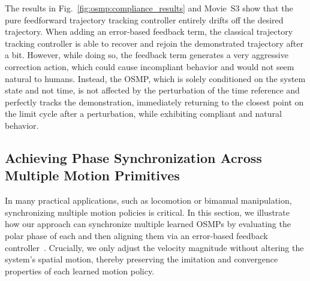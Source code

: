 The results in Fig.~\ref{fig:osmp:compliance_results} and Movie~S3 show that the pure feedforward trajectory tracking controller entirely drifts off the desired trajectory. When adding an error-based feedback term, the classical trajectory tracking controller is able to recover and rejoin the demonstrated trajectory after a bit. However, while doing so, the feedback term generates a very aggressive correction action, which could cause incompliant behavior and would not seem natural to humans. Instead, the \gls{OSMP}, which is solely conditioned on the system state and not time, is not affected by the perturbation of the time reference and perfectly tracks the demonstration, immediately returning to the closest point on the limit cycle after a perturbation, while exhibiting compliant and natural behavior.


\subsection{Achieving Phase Synchronization Across Multiple Motion Primitives}
In many practical applications, such as locomotion or bimanual manipulation, synchronizing multiple motion policies is critical. In this section, we illustrate how our approach can synchronize multiple learned \glspl{OSMP} by evaluating the polar phase of each and then aligning them via an error-based feedback controller~\citep{dorfler2014synchronization}. Crucially, we only adjust the velocity magnitude without altering the system’s spatial motion, thereby preserving the imitation and convergence properties of each learned motion policy.

